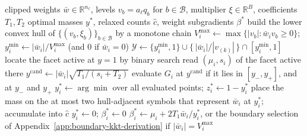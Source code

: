 \documentclass{article}
\begin{document}
\begin{algorithm}[H]
\caption{Exact inner solve for one tensor at a fixed multiplier. Cost
$O(C+n_\ell C)$; no iteration.}
\label{alg:hull}
\begin{algorithmic}[1]
\Require clipped weights $\bar w\in\mathbb R^{n_\ell}$, levels
$v_b=a_\ell q_b$ for $b\in\mathcal B$, multiplier $\xi\in\mathbb R^{B}$,
coefficients $T_1,T_2$
\Ensure optimal masses $y^*$, relaxed counts $\widehat c$, weight subgradients
$\beta^*$
\State build the lower convex hull of $\{(v_b,\xi_b)\}_{b\in\mathcal B}$ by a
monotone chain 
  \State $V_i^{\max}\gets\max\{|v_b|:\bar w_iv_b\geq0\}$;
         $y_i^{\min}\gets|\bar w_i|/V_i^{\max}$ (and $0$ if $\bar w_i=0$)
  \State $\mathcal Y\gets\{y^{\min}_i,1\}\cup\{\,|\bar w_i|/|v_{(k)}|\,\}\cap[y_i^{\min},1]$
  \State locate the facet active at $y=1$ by binary search 
    \State read $(\mu_i,s_i)$ of the facet active there
      $y^{\mathrm{cand}}\gets|\bar w_i|\sqrt{T_1/(s_i+T_2)}$
    \EndIf
    \State evaluate $G_i$ at $y^{\mathrm{cand}}$ if it lies in $[y_-,y_+]$, and
           at $y_-$ and $y_+$ 
  \EndFor
  \State $y_i^*\gets\arg\min$ over all evaluated points; $z_i^*\gets1-y_i^*$
  \State place the mass on the at most two hull-adjacent symbols that represent
         $\bar w_i$ at $y_i^*$; accumulate into $\widehat c$
   $y_i^*\gets0$; $\beta_i^*\gets0$
  \Else{} $\beta_i^*\gets\mu_i+2T_1\bar w_i/y_i^*$, or the boundary selection of
      Appendix~\ref{app:boundary-kkt-derivation} if $|\bar w_i|=V_i^{\max}$
  \EndIf
\EndFor
\end{algorithmic}
\end{algorithm}
\end{document}
